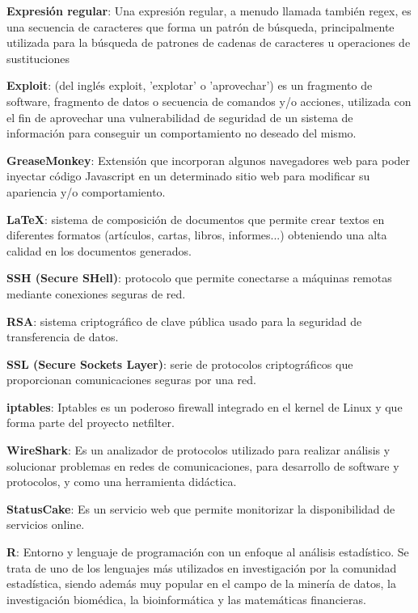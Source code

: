 \textbf{Expresión regular}: Una expresión regular, a menudo llamada también regex, es una secuencia de caracteres que forma un patrón de búsqueda, principalmente utilizada para la búsqueda de patrones de cadenas de caracteres u operaciones de sustituciones
\bigskip

\textbf{Exploit}: (del inglés exploit, 'explotar' o 'aprovechar') es un fragmento de software, fragmento de datos o secuencia de comandos y/o acciones, utilizada con el fin de aprovechar una vulnerabilidad de seguridad de un sistema de información para conseguir un comportamiento no deseado del mismo.
\bigskip

\textbf{GreaseMonkey}: Extensión que incorporan algunos navegadores web para poder inyectar código Javascript en un determinado sitio web para modificar su apariencia y/o comportamiento.
\bigskip

\textbf{LaTeX}: sistema de composición de documentos que permite crear textos en diferentes formatos (artículos, cartas, libros, informes...) obteniendo una alta calidad en los documentos generados.
\bigskip


\textbf{SSH (Secure SHell)}: protocolo que permite conectarse a máquinas remotas mediante conexiones seguras de red.
\bigskip

\textbf{RSA}: sistema criptográfico de clave pública usado para la seguridad de transferencia de datos.
\bigskip

\textbf{SSL (Secure Sockets Layer)}: serie de protocolos criptográficos que proporcionan comunicaciones seguras por una red.
\bigskip


\textbf{iptables}: Iptables es un poderoso firewall integrado en el kernel de Linux y que forma parte del proyecto netfilter.
\bigskip



\textbf{WireShark}: Es un analizador de protocolos utilizado para realizar análisis y solucionar problemas en redes de comunicaciones, para desarrollo de software y protocolos, y como una herramienta didáctica.
\bigskip

\textbf{StatusCake}: Es un servicio web que permite monitorizar la disponibilidad de servicios online.
\bigskip

\textbf{R}: Entorno y lenguaje de programación con un enfoque al análisis estadístico. Se trata de uno de los lenguajes más utilizados en investigación por la comunidad estadística, siendo además muy popular en el campo de la minería de datos, la investigación biomédica, la bioinformática y las matemáticas financieras. 
\bigskip

